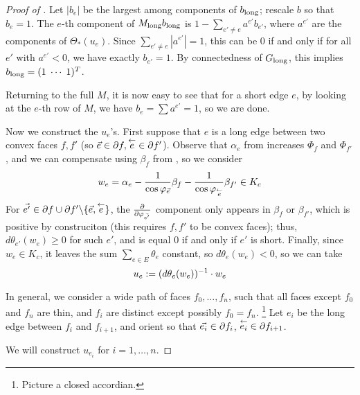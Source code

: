 \begin{proof}[Proof of ]
Let $|b_e|$ be the largest among components of $b_{\text{long}}$;
rescale $b$ so that $b_e = 1$.
The $e$-th component of $M_{\text{long}} b_{\text{long}}$
is $1 - \sum_{e' \neq e} a^{e'} b_{e'}$,
where $a^{e'}$ are the components of $\Theta_*(u_e)$.
Since $\sum_{e' \neq e} |a^{e'}| = 1$, this can be 0 if and only if
for all $e'$ with $a^{e'} < 0$, we have exactly $b_{e'} = 1$.
By connectedness of $G_{\text{long}}$, this implies
$b_{\text{long}} = (1 \; \cdots \; 1)^T$.


Returning to the full $M$, it is now easy to see that
for a short edge $e$,
by looking at the $e$-th row of $M$,
we have $b_e = \sum a^{e'} = 1$,
so we are done.



Now we construct the $u_e$'s.
First suppose that $e$ is a long edge between two convex faces $f, f'$
(so $\vec{e} \in \partial f, \overset{\leftarrow}{e} \in \partial f'$).
Observe that $\alpha_e$ from 
increases $\Phi_f$ and $\Phi_{f'}$,
and we can compensate using $\beta_f$ from ,
so we consider
\[
w_e = \alpha_e - \frac{1}{\cos \varphi_{\vec{e}}} \beta_f
	- \frac{1}{\cos \varphi_{\overset{\leftarrow}{e}}} \beta_{f'} \in K_c
\]
For $\vec{e'} \in \partial f \cup \partial f' \backslash \{\vec{e},\overset{\leftarrow}{e}\}$,
the ${\frac{\partial}{\partial \varphi_{\vec{e'}}}}$ component only appears in $\beta_f$
or $\beta_{f'}$, which is positive by construciton
(this requires $f,f'$ to be convex faces);
thus, $d\theta_{e'}(w_e) \geq 0$ for such $e'$, and
is equal 0 if and only if $e'$ is short.
Finally, since $w_e \in K_c$, it leaves the sum $\sum_{e\in E} \theta_e$
constant, so $d\theta_e(w_e) < 0$, so we can take
\begin{equation}
\label{e:u_e}
u_e := (d\theta_e(w_e))^{-1} \cdot w_e
\end{equation}

In general, we consider a wide path of faces $f_0, \ldots, f_n$,
such that all faces except $f_0$ and $f_n$ are thin,
and $f_i$ are distinct except possibly $f_0 = f_n$.
\footnote{Picture a closed accordian.}
Let $e_i$ be the long edge between $f_i$ and $f_{i+1}$,
and orient so that $\vec{e_i} \in \partial f_i$, $\overset{\leftarrow}{e_i} \in \partial f_{i+1}$.


We will construct $u_{e_i}$ for $i = 1,\ldots,n$.



\end{proof}
